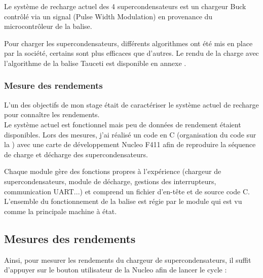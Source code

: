 Le système de recharge actuel des 4 supercondensateurs est un chargeur Buck contrôlé via un signal  (Pulse Width Modulation) en provenance du microcontrôleur de la balise.


Pour charger les supercondensateurs, différents algorithmes ont été mis en place par la société, certains sont plus efficaces que d'autres. Le rendu de la charge avec l'algorithme de la balise Tauceti est disponible en annexe .\\

\subsubsection{Mesure des rendements}



L'un des objectifs de mon stage était de caractériser le système actuel de recharge pour connaître les rendements.\\
Le système actuel est fonctionnel mais peu de données de rendement étaient disponibles. Lors des mesures, j'ai réalisé un code en C (organisation du code sur la ) avec une carte de développement Nucleo F411 afin de reproduire la séquence de charge et décharge des supercondensateurs.\\
\vspace{1cm}

Chaque module gère des fonctions propres à l'expérience (chargeur de supercondensateurs, module de décharge, gestions des interrupteurs, communication UART...) et comprend un fichier d'en-tête et de source code C.\\


L'ensemble du fonctionnement de la balise est régie par le module  qui est vu comme la principale machine à état.


\subsection{Mesures des rendements}

Ainsi, pour mesurer les rendements du chargeur de supercondensateurs, il suffit d'appuyer sur le bouton utilisateur de la Nucleo afin de lancer le cycle : 


